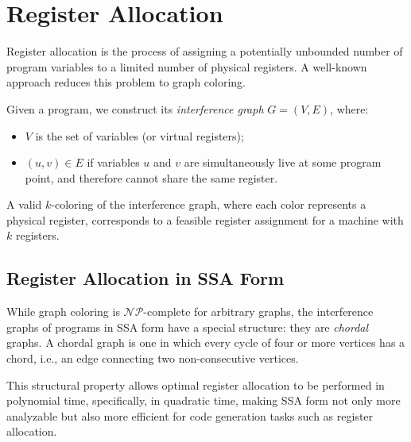 
\section{Register Allocation}
\label{sec:ra}

Register allocation is the process of assigning a potentially unbounded number of program variables to a limited number of physical registers. A well-known approach reduces this problem to graph coloring.

Given a program, we construct its \textit{interference graph} $G = (V, E)$, where:

\begin{itemize}
    \item $V$ is the set of variables (or virtual registers);
    \item $(u, v) \in E$ if variables $u$ and $v$ are simultaneously live at some program point, and therefore cannot share the same register.
\end{itemize}

A valid $k$-coloring of the interference graph, where each color represents a physical register, corresponds to a feasible register assignment for a machine with $k$ registers.

\subsection{Register Allocation in SSA Form}

While graph coloring is $\mathcal{NP}$-complete for arbitrary graphs, the interference graphs of programs in SSA form have a special structure: they are \textit{chordal} graphs. A chordal graph is one in which every cycle of four or more vertices has a chord, i.e., an edge connecting two non-consecutive vertices.

This structural property allows optimal register allocation to be performed in polynomial time, specifically, in quadratic time, making SSA form not only more analyzable but also more efficient for code generation tasks such as register allocation.


